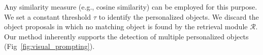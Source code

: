 Any similarity measure (e.g., cosine similarity) can be employed for this purpose.
We set a constant threshold $\tau$ to identify the personalized objects.
We discard the object proposals in which no matching object is found by the retrieval module $\mathcal{R}$.
 Our method inherently supports the detection of multiple personalized objects (Fig~\ref{fig:visual_prompting}).%
 \vspace{-0.1cm}
